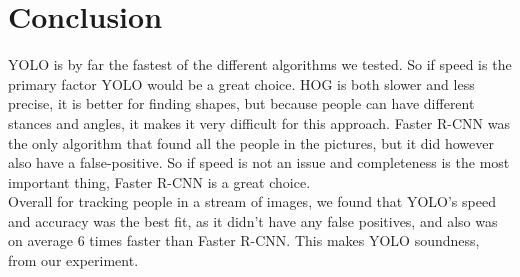 \section{Conclusion}
YOLO is by far the fastest of the different algorithms we tested. So if speed is the primary factor YOLO would be a great choice. HOG is both slower and less precise, it is better for finding shapes, but because people can have different stances and angles, it makes it very difficult for this approach.
Faster R-CNN was the only algorithm that found all the people in the pictures, but it did however also have a false-positive. So if speed is not an issue and completeness is the most important thing, Faster R-CNN is a great choice.\\
Overall for tracking people in a stream of images, we found that YOLO’s speed and accuracy was the best fit, as it didn't have any false positives, and also was on average 6 times faster than Faster R-CNN. This makes YOLO soundness, from our experiment.
